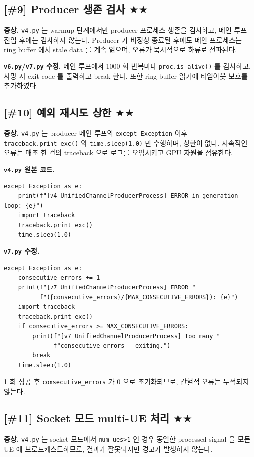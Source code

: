 \documentclass[11pt,a4paper]{article}
\newcommand{\stwo}{\textcolor{starcolor}{$\bigstar\bigstar$}}
\newcommand{\vfour}{\texttt{v4.py}}
\newcommand{\vsix}{\texttt{v6.py}}
\newcommand{\vseven}{\texttt{v7.py}}
\newcommand{\bugitem}[3]{%
  \subsection{[\##1] #2 \hfill #3}%
  \vspace{-0.5em}%
}
\begin{document}
\bugitem{9}{Producer 생존 검사}{\stwo}

\textbf{증상.} \vfour{} 는 warmup 단계에서만 producer 프로세스 생존을
검사하고, 메인 루프 진입 후에는 검사하지 않는다. Producer 가 비정상
종료된 후에도 메인 프로세스는 ring buffer 에서 stale data 를 계속 읽으며,
오류가 묵시적으로 하류로 전파된다.

\textbf{\vsix/\vseven{} 수정.} 메인 루프에서 1000 회 반복마다
\texttt{proc.is\_alive()} 를 검사하고, 사망 시 exit code 를 출력하고
break 한다. 또한 ring buffer 읽기에 타임아웃 보호를 추가하였다.

\bugitem{10}{예외 재시도 상한}{\stwo}

\textbf{증상.} \vfour{} 는 producer 메인 루프의 \texttt{except Exception}
이후 \texttt{traceback.print\_exc()} 와 \texttt{time.sleep(1.0)} 만
수행하며, 상한이 없다. 지속적인 오류는 매초 한 건의 traceback 으로 로그를
오염시키고 GPU 자원을 점유한다.

\textbf{\vfour{} 원본 코드.}
\begin{lstlisting}[caption={v4.py: lines 1880--1884}]
except Exception as e:
    print(f"[v4 UnifiedChannelProducerProcess] ERROR in generation loop: {e}")
    import traceback
    traceback.print_exc()
    time.sleep(1.0)
\end{lstlisting}

\textbf{\vseven{} 수정.}
\begin{lstlisting}[caption={v7.py: lines 2154--2164}]
except Exception as e:
    consecutive_errors += 1
    print(f"[v7 UnifiedChannelProducerProcess] ERROR "
          f"({consecutive_errors}/{MAX_CONSECUTIVE_ERRORS}): {e}")
    import traceback
    traceback.print_exc()
    if consecutive_errors >= MAX_CONSECUTIVE_ERRORS:
        print(f"[v7 UnifiedChannelProducerProcess] Too many "
              f"consecutive errors - exiting.")
        break
    time.sleep(1.0)
\end{lstlisting}
1 회 성공 후 \texttt{consecutive\_errors} 가 0 으로 초기화되므로,
간헐적 오류는 누적되지 않는다.

\bugitem{11}{Socket 모드 multi-UE 처리}{\stwo}

\textbf{증상.} \vfour{} 는 socket 모드에서 \texttt{num\_ues>1} 인 경우
동일한 processed signal 을 모든 UE 에 브로드캐스트하므로, 결과가 잘못되지만
경고가 발생하지 않는다.
\end{document}
